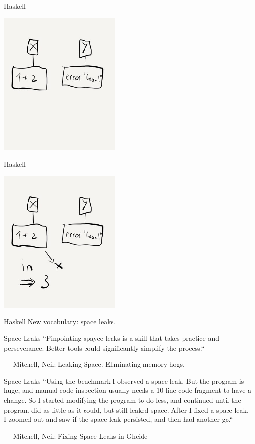 \documentclass[aspectratio=169,14pt]{beamer}
\begin{document}
  \begin{frame}{Haskell}
    \begin{center}
      \includegraphics[width=6cm]{lazy_before}
    \end{center}
  \end{frame}
  \begin{frame}{Haskell}
    \begin{center}
      \includegraphics[width=6cm]{lazy_after}
    \end{center}
  \end{frame}
  \begin{frame}{Haskell}
    New vocabulary: space leaks.
  \end{frame}
  \begin{frame}{Space Leaks}
    ``Pinpointing spayce leaks is a skill that takes practice and perseverance. Better
    tools could significantly simplify the process.``

    --- Mitchell, Neil: Leaking Space. Eliminating memory hogs.
  \end{frame}
  \begin{frame}{Space Leaks}
    ``Using the benchmark I observed a space leak. But the program is huge, and
    manual code inspection usually needs a 10 line code fragment to have a change.
    So I started modifying the program to do less, and continued until the program
    did as little as it could, but still leaked space. After I fixed a space leak,
    I zoomed out and saw if the space leak persisted, and then had another go.``

    --- Mitchell, Neil: Fixing Space Leaks in Ghcide
  \end{frame}
\end{document}
